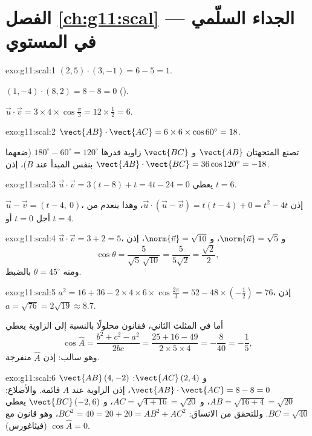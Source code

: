 \section*{الفصل \ref{ch:g11:scal} --- الجداء السلّمي في المستوي}

\begin{solution}{exo:g11:scal:1}
$(2,5)\cdot(3,-1) = 6 - 5 = 1$.

$(1,-4)\cdot(8,2) = 8 - 8 = 0$ ().

$\vec u\cdot\vec v = 3 \times 4 \times \cos\frac\pi3 = 12 \times \frac12
= 6$.
\end{solution}

\begin{solution}{exo:g11:scal:2}
$\vect{AB}\cdot\vect{AC} = 6 \times 6 \times \cos 60^\circ = 18$.

تصنع المتجهتان $\vect{AB}$ و $\vect{BC}$ زاوية قدرها
$180^\circ - 60^\circ = 120^\circ$ (ضعهما بنفس المبدأ عند $B$)، إذن
$\vect{AB}\cdot\vect{BC} = 36 \cos 120^\circ = -18$.
\end{solution}

\begin{solution}{exo:g11:scal:3}
$\vec u \cdot \vec v = 3(t - 8) + t = 4t - 24 = 0$ يعطي $t = 6$.

$\vec u - \vec v = (t - 4,\ 0)$، إذن
$\vec u \cdot (\vec u - \vec v) = t(t-4) + 0 = t^2 - 4t$، وهذا ينعدم
من أجل $t = 0$ أو $t = 4$.
\end{solution}

\begin{solution}{exo:g11:scal:4}
$\vec u \cdot \vec v = 3 + 2 = 5$، و $\norm{\vec u} = \sqrt5$،
و $\norm{\vec v} = \sqrt{10}$، إذن
\[
\cos\theta = \frac{5}{\sqrt5\,\sqrt{10}} = \frac{5}{5\sqrt2}
= \frac{\sqrt2}{2},
\]
ومنه $\theta = 45^\circ$ بالضبط.
\end{solution}

\begin{solution}{exo:g11:scal:5}
$a^2 = 16 + 36 - 2 \times 4 \times 6 \times \cos\frac{2\pi}{3}
= 52 - 48 \times \left(-\frac12\right) = 76$، إذن $a = \sqrt{76} =
2\sqrt{19} \approx 8.7$.

أما في المثلث الثاني، فقانون  محلولًا بالنسبة إلى الزاوية يعطي
\[
\cos\widehat A = \frac{b^2 + c^2 - a^2}{2bc}
= \frac{25 + 16 - 49}{2 \times 5 \times 4} = -\frac{8}{40} = -\frac15,
\]
وهو سالب: إذن $\widehat A$ منفرجة.
\end{solution}

\begin{solution}{exo:g11:scal:6}
$\vect{AB}\,(4, -2)$ و $\vect{AC}\,(2, 4)$:
$\vect{AB}\cdot\vect{AC} = 8 - 8 = 0$، إذن الزاوية عند $A$ قائمة.
والأضلاع: $AB = \sqrt{16 + 4} = \sqrt{20}$، و $AC = \sqrt{4 + 16} =
\sqrt{20}$، و $\vect{BC}\,(-2, 6)$ يعطي $BC = \sqrt{40}$. وللتحقق من الاتساق:
$BC^2 = 40 = 20 + 20 = AB^2 + AC^2$، وهو قانون  مع
$\cos\widehat A = 0$ (فيثاغورس).
\end{solution}

